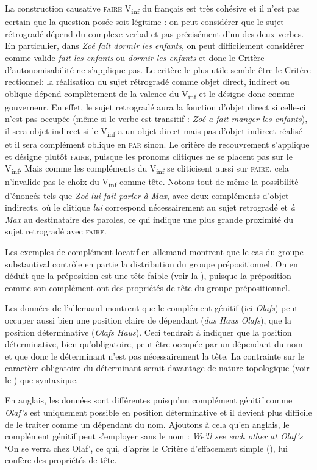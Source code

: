 {     La construction causative \textsc{faire} V\textsubscript{inf} du français est très cohésive et il n’est pas certain que la question posée soit légitime : on peut considérer que le sujet rétrogradé dépend du complexe verbal et pas précisément d’un des deux verbes. En particulier, dans \textit{Zoé fait dormir les enfants}, on peut difficilement considérer comme valide \textit{fait les enfants} ou \textit{dormir les enfants} et donc le Critère d’autonomisabilité ne s’applique pas. Le critère le plus utile semble être le Critère rectionnel: la réalisation du sujet rétrogradé comme objet direct, indirect ou oblique dépend complètement de la valence du V\textsubscript{inf} et le désigne donc comme gouverneur. En effet, le sujet retrogradé aura la fonction d’objet direct si celle-ci n’est pas occupée (même si le verbe est transitif : \textit{Zoé a fait manger les enfants}), il sera objet indirect si le V\textsubscript{inf} a un objet direct mais pas d’objet indirect réalisé et il sera complément oblique en \textsc{par} sinon. Le critère de recouvrement s’applique et désigne plutôt \textsc{faire}, puisque les pronoms clitiques ne se placent pas sur le V\textsubscript{inf}. Mais comme les compléments du V\textsubscript{inf} se cliticisent aussi sur \textsc{faire}, cela n’invalide pas le choix du V\textsubscript{inf} comme tête. Notons tout de même la possibilité d'énoncés tels que \textit{Zoé lui fait parler à Max}, avec deux compléments d'objet indirects, où
    le clitique \textit{lui} correspond nécessairement au sujet retrogradé et \textit{à Max} au destinataire des paroles, ce qui indique une plus grande proximité du sujet retrogradé avec \textsc{faire}.

     Les exemples de complément locatif en allemand montrent que le cas du groupe substantival contrôle en partie la distribution du groupe prépositionnel. On en déduit que la préposition est une tête faible (voir la ), puisque la préposition comme son complément ont des propriétés de tête du groupe prépositionnel.

     Les données de l’allemand montrent que le complément génitif (ici \textit{Olafs}) peut occuper aussi bien une position claire de dépendant (\textit{das Haus Olafs}), que la position déterminative (\textit{Olafs Haus}). Ceci tendrait à indiquer que la position déterminative, bien qu’obligatoire, peut être occupée par un dépendant du nom et que donc le déterminant n’est pas nécessairement la tête. La contrainte sur le caractère obligatoire du déterminant serait davantage de nature topologique (voir le ) que syntaxique.

    En anglais, les données sont différentes puisqu'un complément génitif comme \textit{Olaf's} est uniquement possible en position déterminative et il devient plus difficile de le traiter comme un dépendant du nom. Ajoutons à cela qu’en anglais, le complément génitif peut s’employer sans le nom : \textit{We’ll see each other at Olaf’s} ‘On se verra chez Olaf’, ce qui, d'après le Critère d'effacement simple (), lui confère des propriétés de tête.
}
